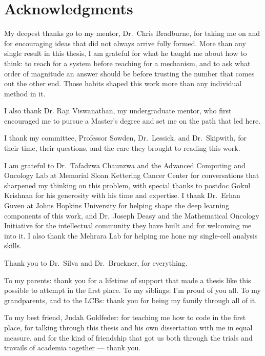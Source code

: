 
\chapter*{Acknowledgments}

\begin{singlespace}

My deepest thanks go to my mentor, Dr.\ Chris Bradburne, for taking me on and for
encouraging ideas that did not always arrive fully formed. More than any single
result in this thesis, I am grateful for what he taught me about how to think:
to reach for a system before reaching for a mechanism, and to ask what order of
magnitude an answer should be before trusting the number that comes out the other
end. Those habits shaped this work more than any individual method in it.

I also thank Dr. Raji Viswanathan, my undergraduate mentor, who first encouraged me to pursue a Master's degree and set me on the path that led here.

I thank my committee, Professor Sowden, Dr.\ Lessick, and Dr.\ Skipwith, for their
time, their questions, and the care they brought to reading this work.

I am grateful to Dr.\ Tafadzwa Chaunzwa and the Advanced Computing and Oncology
Lab at Memorial Sloan Kettering Cancer Center for conversations that sharpened my
thinking on this problem, with special thanks to postdoc Gokul Krishnan for his
generosity with his time and expertise. I thank Dr.\ Erhan Guven at Johns Hopkins University for helping shape
the deep learning components of this work, and Dr.\ Joseph Deasy and the
Mathematical Oncology Initiative for the intellectual community they have built
and for welcoming me into it. I also thank the Mehrara Lab for helping me hone my
single-cell analysis skills.

Thank you to Dr.\ Silva and Dr.\ Bruckner, for everything.

To my parents: thank you for a lifetime of support that made a thesis like this
possible to attempt in the first place. To my siblings: I'm proud of you all.
To my grandparents, and to the LCBs: thank you for being my family through all
of it.

To my best friend, Judah Goldfeder: for teaching me how to code in the first
place, for talking through this thesis and his own dissertation with me in
equal measure, and for the kind of friendship that got us both through the
trials and travails of academia together --- thank you.

\end{singlespace}